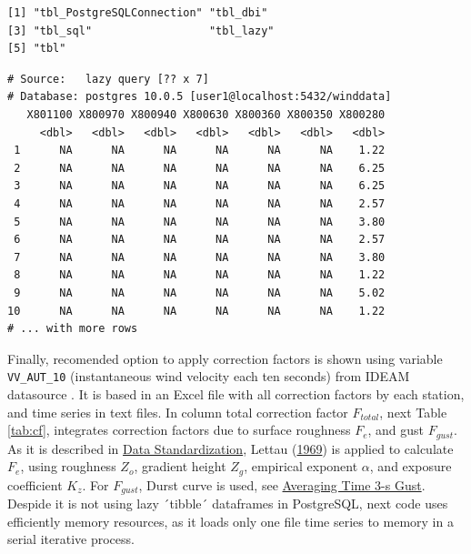 \documentclass[12pt,oneside]{reedthesis}
\newenvironment{Shaded}{\begin{snugshade}}{\end{snugshade}}
\newcommand{\DecValTok}[1]{\textcolor[rgb]{0.00,0.00,0.81}{#1}}
\newcommand{\KeywordTok}[1]{\textcolor[rgb]{0.13,0.29,0.53}{\textbf{#1}}}
\newcommand{\NormalTok}[1]{#1}
\newcommand{\OperatorTok}[1]{\textcolor[rgb]{0.81,0.36,0.00}{\textbf{#1}}}
\newcommand{\StringTok}[1]{\textcolor[rgb]{0.31,0.60,0.02}{#1}}
\begin{document}
\begin{verbatim}
[1] "tbl_PostgreSQLConnection" "tbl_dbi"                 
[3] "tbl_sql"                  "tbl_lazy"                
[5] "tbl"                     
\end{verbatim}
\vspace{0.4cm}
\begin{Shaded}
\end{Shaded}
\begin{verbatim}
# Source:   lazy query [?? x 7]
# Database: postgres 10.0.5 [user1@localhost:5432/winddata]
   X801100 X800970 X800940 X800630 X800360 X800350 X800280
     <dbl>   <dbl>   <dbl>   <dbl>   <dbl>   <dbl>   <dbl>
 1      NA      NA      NA      NA      NA      NA    1.22
 2      NA      NA      NA      NA      NA      NA    6.25
 3      NA      NA      NA      NA      NA      NA    6.25
 4      NA      NA      NA      NA      NA      NA    2.57
 5      NA      NA      NA      NA      NA      NA    3.80
 6      NA      NA      NA      NA      NA      NA    2.57
 7      NA      NA      NA      NA      NA      NA    3.80
 8      NA      NA      NA      NA      NA      NA    1.22
 9      NA      NA      NA      NA      NA      NA    5.02
10      NA      NA      NA      NA      NA      NA    1.22
# ... with more rows
\end{verbatim}
\normalsize

Finally, recomended option to apply correction factors is shown using variable \texttt{VV\_AUT\_10} (instantaneous wind velocity each ten seconds) from IDEAM datasource . It is based in an Excel file with all correction factors by each station, and time series in text files. In column total correction factor \(F_{total}\), next Table \ref{tab:cf}, integrates correction factors due to surface roughness \(F_{e}\), and gust \(F_{gust}\). As it is described in \protect\hyperlink{rmd-standardization}{Data Standardization}, Lettau (\protect\hyperlink{ref-Lettau1969}{1969}) is applied to calculate \(F_e\), using roughness \(Z_o\), gradient height \(Z_g\), empirical exponent \(\alpha\), and exposure coefficient \(K_z\). For \(F_{gust}\), Durst curve is used, see \protect\hyperlink{rmd-gust}{Averaging Time 3-s Gust}. Despide it is not using lazy ´tibble´ dataframes in PostgreSQL, next code uses efficiently memory resources, as it loads only one file time series to memory in a serial iterative process.
\end{document}
